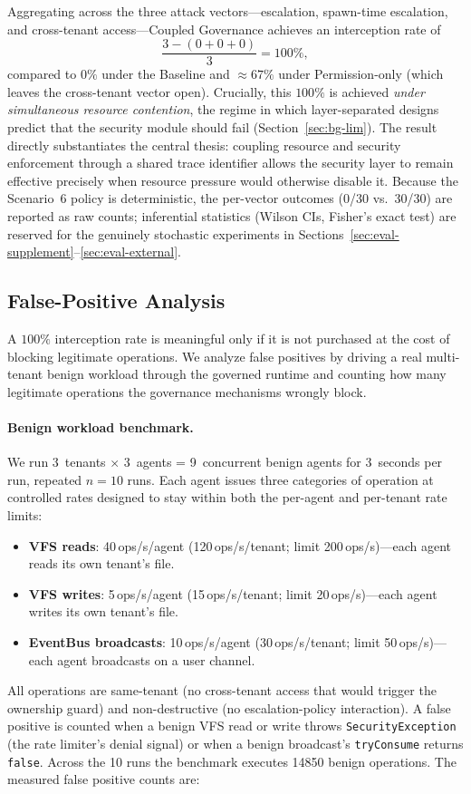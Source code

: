 Aggregating across the three attack vectors---escalation, spawn-time
escalation, and cross-tenant access---Coupled Governance achieves an
interception rate of
\[
\frac{3 - (0 + 0 + 0)}{3} = 100\%,
\]
compared to $0\%$ under the Baseline and $\approx 67\%$ under
Permission-only (which leaves the cross-tenant vector open). Crucially, this
$100\%$ is achieved \emph{under simultaneous resource contention}, the regime
in which layer-separated designs predict that the security module should fail
(Section~\ref{sec:bg-lim}). The result directly substantiates the central thesis:
coupling resource and security enforcement through a shared trace identifier
allows the security layer to remain effective precisely when resource
pressure would otherwise disable it. Because the Scenario~6 policy is
deterministic, the per-vector outcomes (0/30 vs.\ 30/30) are reported as
raw counts; inferential statistics (Wilson CIs, Fisher's exact test) are
reserved for the genuinely stochastic experiments in
Sections~\ref{sec:eval-supplement}--\ref{sec:eval-external}.

\subsection{False-Positive Analysis}
\label{sec:eval-fp}

A $100\%$ interception rate is meaningful only if it is not purchased at the
cost of blocking legitimate operations. We analyze false positives by driving
a real multi-tenant benign workload through the governed runtime and counting
how many legitimate operations the governance mechanisms wrongly block.

\paragraph{Benign workload benchmark.}
We run 3~tenants $\times$ 3~agents = 9~concurrent benign agents for 3~seconds
per run, repeated $n=10$ runs. Each agent issues three categories of operation
at controlled rates designed to stay within both the per-agent and per-tenant
rate limits:
\begin{itemize}
    \item \textbf{VFS reads}: 40\,ops/s/agent (120\,ops/s/tenant; limit
    200\,ops/s)---each agent reads its own tenant's file.
    \item \textbf{VFS writes}: 5\,ops/s/agent (15\,ops/s/tenant; limit
    20\,ops/s)---each agent writes its own tenant's file.
    \item \textbf{EventBus broadcasts}: 10\,ops/s/agent (30\,ops/s/tenant;
    limit 50\,ops/s)---each agent broadcasts on a user channel.
\end{itemize}
All operations are same-tenant (no cross-tenant access that would trigger the
ownership guard) and non-destructive (no escalation-policy interaction). A
false positive is counted when a benign VFS read or write throws
\texttt{SecurityException} (the rate limiter's denial signal) or when a benign
broadcast's \texttt{tryConsume} returns \texttt{false}. Across the 10 runs the
benchmark executes 14\text{,}850 benign operations. The measured false
positive counts are:

